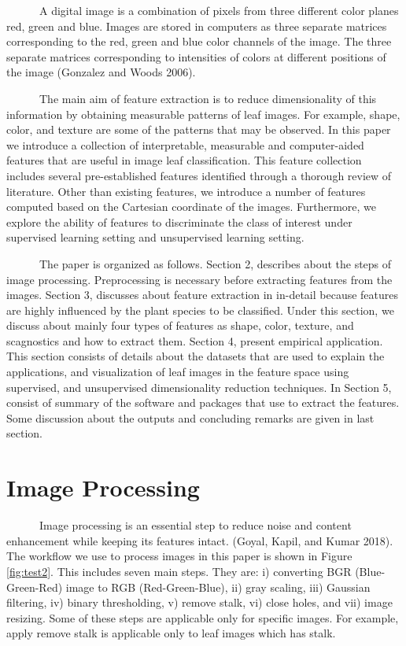 \documentclass{article}
\begin{document}
~~~~~~A digital image is a combination of pixels from three different
color planes red, green and blue. Images are stored in computers as
three separate matrices corresponding to the red, green and blue color
channels of the image. The three separate matrices corresponding to
intensities of colors at different positions of the image (Gonzalez and
Woods 2006).

~~~~~~The main aim of feature extraction is to reduce dimensionality of
this information by obtaining measurable patterns of leaf images. For
example, shape, color, and texture are some of the patterns that may be
observed. In this paper we introduce a collection of interpretable,
measurable and computer-aided features that are useful in image leaf
classification. This feature collection includes several pre-established
features identified through a thorough review of literature. Other than
existing features, we introduce a number of features computed based on
the Cartesian coordinate of the images. Furthermore, we explore the
ability of features to discriminate the class of interest under
supervised learning setting and unsupervised learning setting.

~~~~~~The paper is organized as follows. Section 2, describes about the
steps of image processing. Preprocessing is necessary before extracting
features from the images. Section 3, discusses about feature extraction
in in-detail because features are highly influenced by the plant species
to be classified. Under this section, we discuss about mainly four types
of features as shape, color, texture, and scagnostics and how to extract
them. Section 4, present empirical application. This section consists of
details about the datasets that are used to explain the applications,
and visualization of leaf images in the feature space using supervised,
and unsupervised dimensionality reduction techniques. In Section 5,
consist of summary of the software and packages that use to extract the
features. Some discussion about the outputs and concluding remarks are
given in last section.

\hypertarget{image-processing}{%
\section{Image Processing}\label{image-processing}}

~~~~~~Image processing is an essential step to reduce noise and content
enhancement while keeping its features intact. (Goyal, Kapil, and Kumar
2018). The workflow we use to process images in this paper is shown in
Figure \ref{fig:test2}. This includes seven main steps. They are: i)
converting BGR (Blue-Green-Red) image to RGB (Red-Green-Blue), ii) gray
scaling, iii) Gaussian filtering, iv) binary thresholding, v) remove
stalk, vi) close holes, and vii) image resizing. Some of these steps are
applicable only for specific images. For example, apply remove stalk is
applicable only to leaf images which has stalk.
\end{document}
